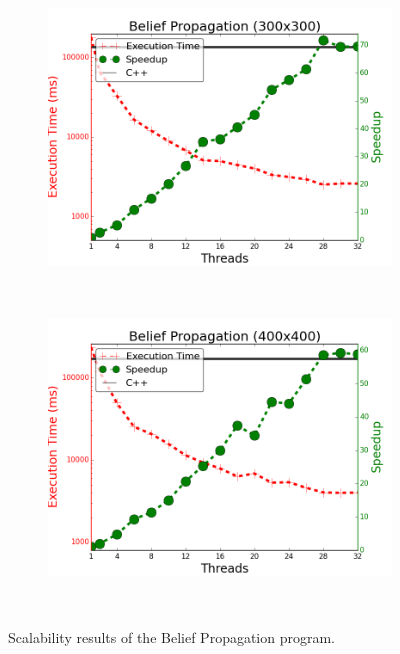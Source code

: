 \begin{figure}[]
        \centering
        \begin{subfigure}[b]{\plotsize\textwidth}
                \includegraphics[width=\textwidth]{experiments/scalability/scale-belief-propagation-300.png}
                \label{fig:implementation:scale_bp300}
        \end{subfigure}
        ~
        \begin{subfigure}[b]{\plotsize\textwidth}
                \includegraphics[width=\textwidth]{experiments/scalability/scale-belief-propagation-400.png}
                \label{fig:implementation:scale_bp400}
        \end{subfigure}\\
        \caption{Scalability results of the Belief Propagation program.}
        \label{fig:implementation:scale_bp}
\end{figure}

